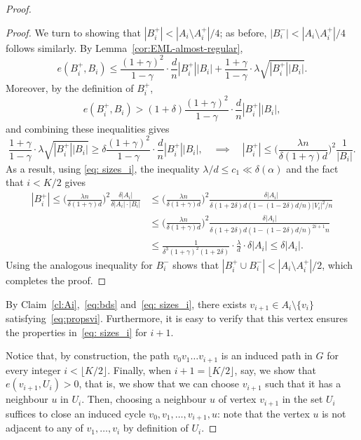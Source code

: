 \documentclass[reqno,a4paper]{amsart}
\theoremstyle{definition}
\begin{document}
\begin{proof}
\begin{proof}
We turn to showing that $|B_i^+| < |A_i \setminus A_i^+|/4$; as before, $|B_i^-| < |A_i \setminus A_i^+|/4$ follows similarly.
By Lemma~\ref{cor:EML-almost-regular},
\[
    e(B_i^+,B_i)
    \le 
    \frac{(1+\gamma)^2}{1-\gamma}\cdot\frac{d}{n}|B_i^+||B_i|
    +\frac{1+\gamma}{1-\gamma}\cdot \lambda \sqrt{|B_i^+||B_i|}.
\]
Moreover, by the definition of $B_i^+$,
\[
    e(B_i^+,B_i)
    >
    (1+\delta)\frac{(1+\gamma)^2}{1-\gamma}\cdot\frac{d}{n}|B_i^+||B_i|,
\]
and combining these inequalities gives
\[
\frac{1+\gamma}{1-\gamma}\cdot \lambda \sqrt{|B_i^+||B_i|}
\ge 
\delta \frac{(1+\gamma)^2}{1-\gamma}\cdot\frac{d}{n}|B_i^+||B_i|,
\quad \implies\quad
|B_i^+|
\le 
\bigg(\frac{\lambda n}{\delta (1+\gamma)d}\bigg)^2 \frac{1}{|B_i|}.
\]
As a result, using \eqref{eq: sizes_i}, the inequality $\lambda/d\le c_1\ll \delta(\alpha)$ and the fact that $i<K/2$ gives
\begin{align*}
|B_i^+|\le \bigg(\frac{\lambda n}{\delta (1+\gamma)d}\bigg)^2 \frac{\delta |A_i|}{\delta |A_i|\cdot |B_i|}
&\le \bigg(\frac{\lambda n}{\delta (1+\gamma)d}\bigg)^2 \frac{\delta |A_i|}{\delta (1 + 2\delta) d (1-(1 - 2\delta)d/n) |V_i|^2/n}\\
&\le \bigg(\frac{\lambda n}{\delta (1+\gamma)d}\bigg)^2 \frac{\delta |A_i|}{\delta (1 + 2\delta) d (1-(1 - 2\delta)d/n)^{2i+1} n}\\
&\le \frac{1}{\delta^3 (1+\gamma)^2 (1+2\delta)}\cdot \frac{\lambda}{d}\cdot \delta |A_i|\le \delta |A_i|.
\end{align*}
Using the analogous inequality for $B^-_i$ shows that $|B_i^+ \cup B_i^-| < |A_i \setminus A_i^+|/2$, which completes the proof.
\end{proof}

By Claim~\ref{cl:Ai},~\eqref{eq:bds} and~\eqref{eq: sizes_i},
there exists $v_{i+1}\in A_i\setminus\{v_i\}$ satisfying~\eqref{eq:propsvi}. 
Furthermore, it is easy to verify that this vertex ensures the properties in~\eqref{eq: sizes_i} for $i+1$.

Notice that, by construction, the path $v_0v_1\ldots v_{i+1}$ is an induced path in $G$ for every integer $i < \lfloor K/2\rfloor$. 
Finally, when $i+1=\lfloor K/2\rfloor$, say, we show that $e(v_{i+1},U_i)>0$, that is, we show that we can choose $v_{i+1}$ such that it has a neighbour $u$ in $U_i$.
Then, choosing a neighbour $u$ of vertex $v_{i+1}$ in the set $U_i$ suffices to close an induced cycle $v_0,v_1,\ldots,v_{i+1},u$: note that the vertex $u$ is not adjacent to any of $v_1,\ldots,v_i$ by definition of $U_i$.


\end{proof}
\end{document}
